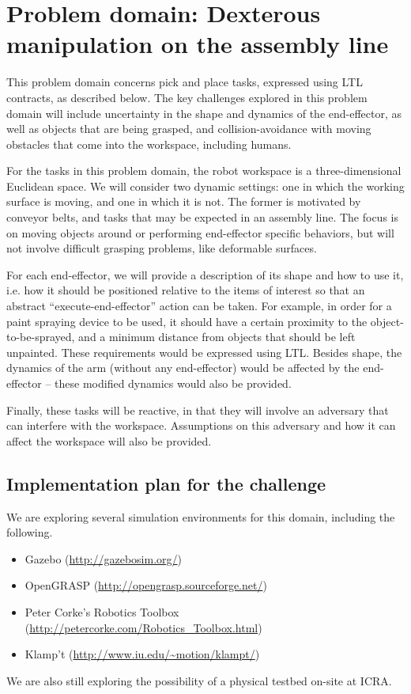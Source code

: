 \documentclass[12pt]{amsart}
\begin{document}
\section{Problem domain: Dexterous manipulation on the assembly line}\label{sec:dexterousmanip}

This problem domain concerns pick and place tasks, expressed using LTL
contracts, as described below. The key challenges explored in this problem
domain will include uncertainty in the shape and dynamics of the end-effector,
as well as objects that are being grasped, and collision-avoidance with moving
obstacles that come into the workspace, including humans.

For the tasks in this problem domain, the robot workspace is a three-dimensional
Euclidean space. We will consider two dynamic settings: one in which the working
surface is moving, and one in which it is not.  The former is motivated by
conveyor belts, and tasks that may be expected in an assembly line. The focus is
on moving objects around or performing end-effector specific behaviors, but will
not involve difficult grasping problems, like deformable surfaces.

For each end-effector, we will provide a description of its shape and how to use
it, i.e.  how it should be positioned relative to the items of interest so that
an abstract ``execute-end-effector'' action can be taken. For example, in order
for a paint spraying device to be used, it should have a certain proximity to
the object-to-be-sprayed, and a minimum distance from objects that should be
left unpainted. These requirements would be expressed using LTL. Besides shape,
the dynamics of the arm (without any end-effector) would be affected by the
end-effector -- these modified dynamics would also be provided.

Finally, these tasks will be reactive, in that they will involve an adversary
that can interfere with the workspace. Assumptions on this adversary and how it
can affect the workspace will also be provided.

\subsection{Implementation plan for the challenge}

We are exploring several simulation environments for this domain, including the following.
\begin{itemize}
\item Gazebo (\url{http://gazebosim.org/})
\item OpenGRASP (\url{http://opengrasp.sourceforge.net/})
\item Peter Corke's Robotics Toolbox
(\url{http://petercorke.com/Robotics_Toolbox.html})
\item Klamp't (\url{http://www.iu.edu/~motion/klampt/})
\end{itemize}

We are also still exploring the possibility of a physical testbed on-site at ICRA.




\end{document}
